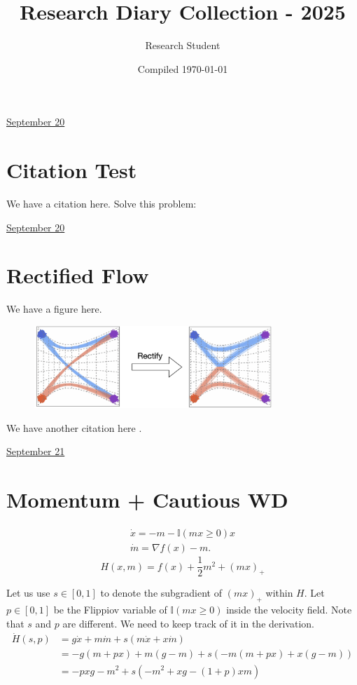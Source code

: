 \documentclass[letterpaper,11pt]{article}
\title{Research Diary Collection - 2025}
\author{Research Student}
\date{Compiled \today}
\begin{document}
\tableofcontents
\thispagestyle{empty}
\newpage


\href{run:2025-09-20-newmethod.tex}{\Huge September 20} 

\section{Citation Test}


We have a citation \cite{research_methods2024} here.  Solve this problem: 



\clearpage


\href{run:2025-09-20.tex}{\Huge September 20} 

\section{Rectified Flow}

We have a figure here. 
\begin{figure}[h]
\centering 
\includegraphics[width=0.8\textwidth]{assets/figures/2025/curved_reflow.png}
\end{figure} 


We have another citation here \cite{li2022diffusion}. 


\clearpage


\href{run:2025-09-21-momentum_cwd.tex}{\Huge September 21} 

\section{Momentum + Cautious WD}

\begin{align}
    \dot x = - m - \mathbb{I}(mx\geq 0) x \\ 
    \dot m = \nabla f(x) - m. 
\end{align}
$$
H(x, m) = f(x) + \frac{1}{2} m^2 + (mx)_+
$$

Let us use $s \in[0,1]$ to denote the subgradient of $(mx)_+$ within $H$. Let $p \in[0,1]$ be the Flippiov variable of $\mathbb{I}(mx \geq 0)$ inside the velocity field. Note that $s$ and $p$ are different. We need to keep track of it in the derivation. 
\begin{align*}
\dot H(s,p) &  =  g \dot x + m \dot m + s (m \dot x + x \dot m) \\ 
& = -g (m + p x) + m(g - m) + s (-m (m + p x) + x (g - m) )\\
& = - p x g - m^2 + s (- m^2 + xg - (1+p)xm)
\end{align*}
\end{document}
